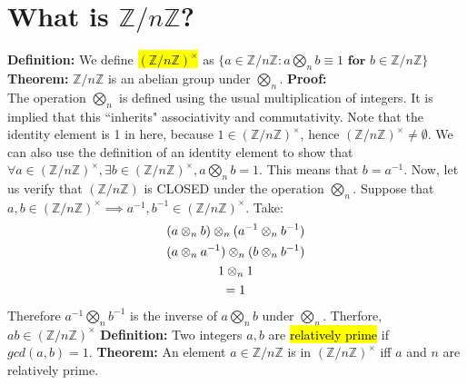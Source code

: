 \documentclass[12pt]{report}
\newcommand{\definitions}[1]{{\leavevmode\color{blue} #1}}
\newcommand{\proof}[1]{{\leavevmode\color{ForestGreen} #1}}
\begin{document}
	\section{What is $\mathbb{Z}/n\mathbb{Z}$?}
	\definitions{
		\textbf{Definition: }We define \hl{$(\mathbb{Z}/n\mathbb{Z})^\times$} as $\{a\in \mathbb{Z}/n\mathbb{Z}: a\bigotimes_n b\equiv 1 \textbf{ for }b\in \mathbb{Z}/n\mathbb{Z}\}$ \\
		\vskip 0.05in
		\textbf{Theorem: } $\mathbb{Z}/n\mathbb{Z}$ is an abelian group under $\bigotimes_n$. 
	}
	\vskip 0.05in
	\proof{
		\textbf{Proof: }\\
		The operation $\bigotimes_n$ is defined using the usual multiplication of integers. It is implied that this ``inherits" associativity and commutativity. Note that the identity element is 1 in here, because $1\in(\mathbb{Z}/n\mathbb{Z})^\times$, hence $(\mathbb{Z}/n\mathbb{Z})^\times\neq\emptyset$. We can also use the definition of an identity element to show that $\forall a\in (\mathbb{Z}/n\mathbb{Z})^\times, \exists b\in(\mathbb{Z}/n\mathbb{Z})^\times, a\bigotimes_n b=1$. This means that $b=a^{-1}$. Now, let us verify that $(\mathbb{Z}/n\mathbb{Z})$ is CLOSED under the operation $\bigotimes_n$. Suppose that $a,b\in(\mathbb{Z}/n\mathbb{Z})^\times\implies a^{-1}, b^{-1}\in(\mathbb{Z}/n\mathbb{Z})^\times$. Take: 
		\begin{gather}
			\setcounter{equation}{0}
			(a\otimes_n b)\otimes_n(a^{-1}\otimes_n b^{-1})\\
			(a\otimes_n a^{-1})\otimes_n(b\otimes_n b^{-1})\\
			1\otimes_n 1\\
			=1
		\end{gather}
		Therefore $a^{-1}\bigotimes_n b^{-1}$ is the inverse of $a\bigotimes_n b$ under $\bigotimes_n$. Therfore, $ab\in(\mathbb{Z}/n\mathbb{Z})^\times$
	}
	\vskip 0.1in
	\definitions{
		\textbf{Definition: }Two integers $a,b$ are \hl{relatively prime} if $gcd(a,b)=1$. 
		\vskip 0.05in
		\textbf{Theorem: } An element $a\in\mathbb{Z}/n\mathbb{Z}$ is in $(\mathbb{Z}/n\mathbb{Z})^\times$ iff $a$ and $n$ are relatively prime. 
	}
	\vskip 0.05in
\end{document}

